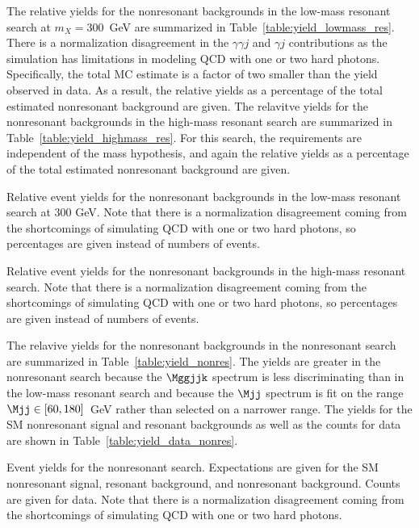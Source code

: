 The relative yields for the nonresonant backgrounds in the low-mass resonant search at $m_X = 300$~GeV
are summarized in
Table~\ref{table:yield_lowmass_res}. There is a normalization disagreement in the
$\gamma\gamma j$ and $\gamma j$ contributions as the simulation has limitations in modeling
QCD with one or two hard photons. Specifically, the total MC estimate is a factor of two
smaller than the yield observed in data.
As a result, the relative yields as a percentage of the total estimated
nonresonant background are given.
The relavitve yields for the nonresonant backgrounds in the high-mass resonant search are summarized in
Table~\ref{table:yield_highmass_res}. For this search, the requirements are independent of
the mass hypothesis, and again the relative yields as a percentage of the total estimated nonresonant
background are given.

\begin{table}[htbp!]
  \centering
  \renewcommand{\arraystretch}{1.4}
  \caption{Relative event yields for the nonresonant backgrounds in the low-mass resonant search
at 300 GeV. Note that there is a normalization disagreement coming from the shortcomings of
simulating QCD with one or two hard photons, so percentages are given instead of numbers
of events.}
  
  \label{table:yield_lowmass_res}
\end{table}

\begin{table}[htbp!]
  \centering
  \renewcommand{\arraystretch}{1.4}
  \caption{Relative event yields for the nonresonant backgrounds in the high-mass resonant search.
Note that there is a normalization disagreement coming from the shortcomings of simulating QCD with one
or two hard photons, so percentages are given instead of numbers of events.}
  
  \label{table:yield_highmass_res}
\end{table}

The relavive yields for the nonresonant backgrounds in the nonresonant search are summarized in
Table~\ref{table:yield_nonres}. The yields are greater in the nonresonant search
because the $\Mggjjk$ spectrum is less
discriminating than in the low-mass resonant search and because the $\Mjj$ spectrum is
fit on the range $\Mjj \in [60,180]$~GeV rather than selected on a narrower range.
The yields for the SM nonresonant signal and resonant backgrounds as well as the counts for
data are shown in Table~\ref{table:yield_data_nonres}.

\begin{table}[htbp!]
  \centering
  \renewcommand{\arraystretch}{1.4}
  \caption{Event yields for the nonresonant search. Expectations are given for
the SM nonresonant signal, resonant background, and nonresonant background.
Counts are given for data. Note that
there is a normalization disagreement coming from the shortcomings of simulating QCD with one
or two hard photons.}
  
  \label{table:yield_nonres}
\end{table}

